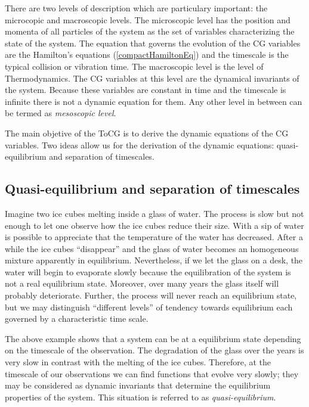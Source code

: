 \documentclass[b5paper,openright,10pt]{book}
\begin{document}
There are two levels of description which are particulary important: the microcopic and macroscopic levels.
The microscopic level has the position and momenta of all particles of the system as the set of variables characterizing the state of the system. 
The equation that governs the evolution of the CG variables are the Hamilton's equations (\ref{compactHamiltonEq}) and the timescale is the typical collision or vibration time. 
The macroscopic level is the level of Thermodynamics. The CG variables at this level are the dynamical invariants of the system. Because these variables are constant in time and the timescale is infinite there is not a dynamic equation for them.  %
Any other level in between can be termed as {\it mesoscopic level}. 

The main objetive of the ToCG is to derive the dynamic equations of the CG variables. Two ideas allow us for the derivation of the dynamic equations: quasi-equilibrium and separation of timescales.

\subsection{Quasi-equilibrium and separation of timescales}
Imagine two ice cubes melting inside a glass of water.  The process is
slow but not enough to let one  observe how the ice cubes reduce their
size.   With  a sip  of  water  is  possible  to appreciate  that  the
temperature of the  water has decreased.  After a while  the ice cubes
``disappear'' and the glass of water becomes an homogeneous mixture
 apparently in equilibrium.  Nevertheless,  if we let  the glass  on a
desk,  the   water  will  begin   to  evaporate  slowly   because  the
equilibration  of  the  system  is   not  a  real  equilibrium  state.
Moreover, over many years the  glass itself will probably deteriorate.
Further, the process will never reach an equilibrium state, but we may
distinguish  ``different  levels''  of tendency  towards  equilibrium each governed by a characteristic time scale.

The above example shows that a system can be at a equilibrium state depending on the timescale of the observation. The degradation of the glass over the years is very slow in contrast with the melting of the ice cubes. Therefore, at the timescale of our observations we can find functions that evolve very slowly; they may be considered as dynamic invariants that determine the equilibrium properties of the system. This situation is referred to as \textit{quasi-equilibrium}.
\end{document}
